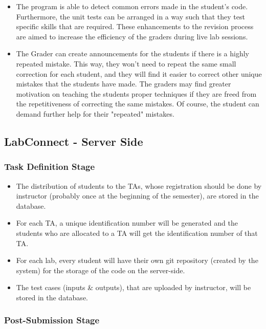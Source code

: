 \documentclass[a4paper, 12pt]{article}
\begin{document}
    \begin{itemize}
      \item The program is able to detect common errors made in the student's code.
      Furthermore, the unit tests can be arranged in a way such that they test specific skills that are
      required. These enhancements to the revision process are aimed to increase the efficiency of the
      graders during live lab sessions.
      \item The Grader can create announcements for the students if there is a highly repeated
      mistake. This way, they won't need to repeat the same small correction for each student,
      and they will find it easier to correct other unique mistakes that the students
      have made. The graders may find greater motivation on teaching the students proper techniques
      if they are freed from the repetitiveness of correcting the same mistakes. Of course, the student can demand
      further help for their "repeated" mistakes.
    \end{itemize}

    \subsection{LabConnect - Server Side}

    \subsubsection{Task Definition Stage}
    \begin{itemize}
      \item The distribution of students to the TAs, whose registration should be done by instructor (probably once at the
      beginning of the semester), are stored in the database.
      \item For each TA, a unique identification number will be generated and the students who are allocated to a
      TA will get the identification number of that TA.
      \item For each lab, every student will have their own git repository (created by the system) for the storage of the
      code on the server-side.
      \item The test cases (inputs \& outputs), that are uploaded by instructor, will be stored in the database.
    \end{itemize}

    \subsubsection{Post-Submission Stage}
\end{document}
